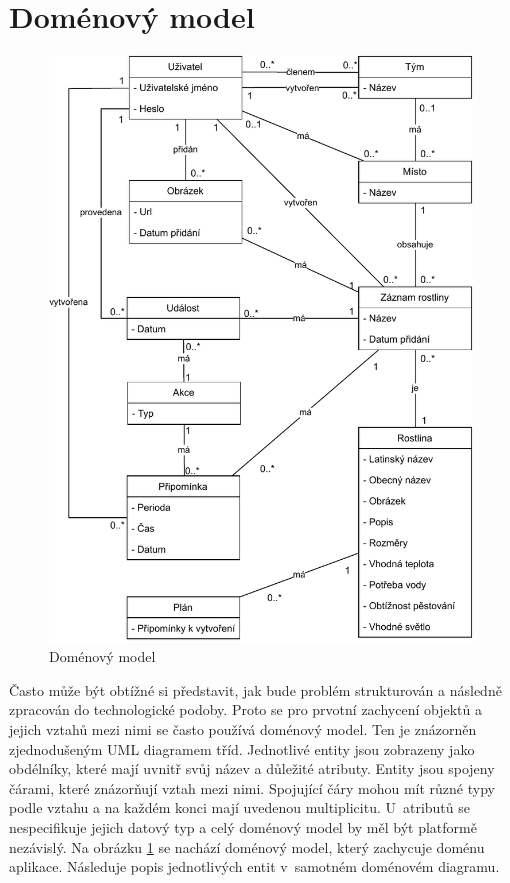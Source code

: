 \documentclass[thesis=M,czech]{FITthesis}[2019/12/23]
\begin{document}
\section{Doménový model}
\begin{figure}
	\centering
	\includegraphics[width=1\linewidth]{images/domain-diagram.pdf}
  	\caption{Doménový model}
  	\label{dia:domain-model}
\end{figure}

Často může být obtížné si představit, jak bude problém strukturován a následně zpracován do technologické podoby. Proto se pro prvotní zachycení objektů a jejich vztahů mezi nimi se často používá doménový model. Ten je znázorněn zjednodušeným UML diagramem tříd. Jednotlivé entity jsou zobrazeny jako obdélníky, které mají uvnitř svůj název a důležité atributy. Entity jsou spojeny čárami, které znázorňují vztah mezi nimi. Spojující čáry mohou mít různé typy podle vztahu a na každém konci mají uvedenou multiplicitu. U~atributů se nespecifikuje jejich datový typ a celý doménový model by měl být platformě nezávislý. Na obrázku \ref{dia:domain-model} se nachází doménový model, který zachycuje doménu aplikace. Následuje popis jednotlivých entit v~samotném doménovém diagramu. \cite{domain-model-1, domain-model-2}
\end{document}
